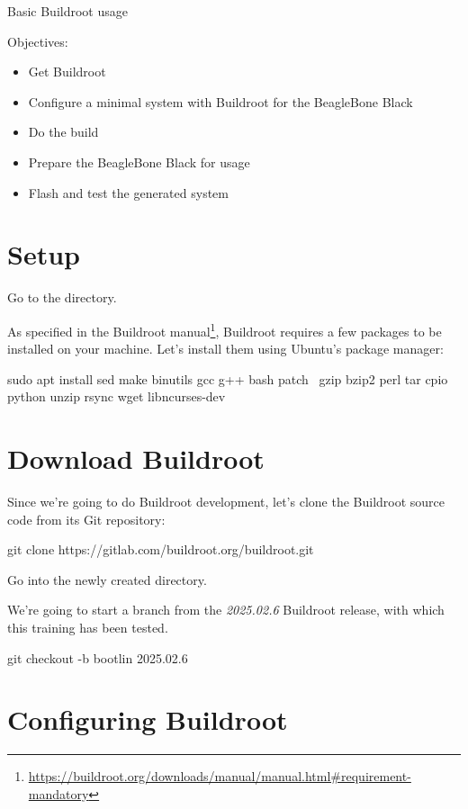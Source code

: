 \subchapter
{Basic Buildroot usage}
{Objectives:
  \begin{itemize}
  \item Get Buildroot
  \item Configure a minimal system with Buildroot for the BeagleBone
    Black
  \item Do the build
  \item Prepare the BeagleBone Black for usage
  \item Flash and test the generated system
  \end{itemize}
}

\section{Setup}

Go to the  directory.

As specified in the Buildroot
manual\footnote{\url{https://buildroot.org/downloads/manual/manual.html\#requirement-mandatory}},
Buildroot requires a few packages to be installed on your
machine. Let's install them using Ubuntu's package manager:

\begin{bashinput}
sudo apt install sed make binutils gcc g++ bash patch \
  gzip bzip2 perl tar cpio python unzip rsync wget libncurses-dev
\end{bashinput}

\section{Download Buildroot}

Since we're going to do Buildroot development, let's clone the
Buildroot source code from its Git repository:

\begin{bashinput}
git clone https://gitlab.com/buildroot.org/buildroot.git
\end{bashinput}

Go into the newly created  directory.

We're going to start a branch from the {\em 2025.02.6} Buildroot
release, with which this training has been tested.

\begin{bashinput}
git checkout -b bootlin 2025.02.6
\end{bashinput}

\section{Configuring Buildroot}

